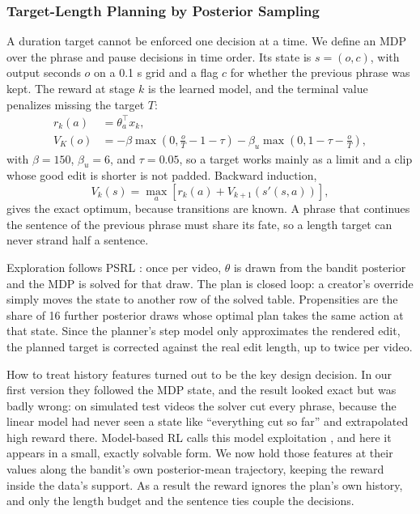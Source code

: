 \documentclass{ieeeaccess}
\begin{document}
\subsubsection{Target-Length Planning by Posterior Sampling}
A duration target cannot be enforced one decision at a time. We define an MDP over the phrase and pause decisions in time order. Its state is $s=(o,c)$, with output seconds $o$ on a 0.1 s grid and a flag $c$ for whether the previous phrase was kept. The reward at stage $k$ is the learned model, and the terminal value penalizes missing the target $T$:
\begin{align}
r_k(a) &= \theta_a^{\top} x_k, \\
V_K(o) &= -\beta \max\!\left(0,\tfrac{o}{T}-1-\tau\right) - \beta_u \max\!\left(0,1-\tau-\tfrac{o}{T}\right),
\end{align}
with $\beta=150$, $\beta_u=6$, and $\tau=0.05$, so a target works mainly as a limit and a clip whose good edit is shorter is not padded. Backward induction,
\begin{equation}
V_k(s) = \max_a \left[ r_k(a) + V_{k+1}\left(s'(s,a)\right) \right], \label{eq:bellman}
\end{equation}
gives the exact optimum, because transitions are known. A phrase that continues the sentence of the previous phrase must share its fate, so a length target can never strand half a sentence.

Exploration follows PSRL \cite{osband2013}: once per video, $\theta$ is drawn from the bandit posterior and the MDP is solved for that draw. The plan is closed loop: a creator's override simply moves the state to another row of the solved table. Propensities are the share of 16 further posterior draws whose optimal plan takes the same action at that state. Since the planner's step model only approximates the rendered edit, the planned target is corrected against the real edit length, up to twice per video.

How to treat history features turned out to be the key design decision. In our first version they followed the MDP state, and the result looked exact but was badly wrong: on simulated test videos the solver cut every phrase, because the linear model had never seen a state like ``everything cut so far'' and extrapolated high reward there. Model-based RL calls this model exploitation \cite{janner2019,yu2020}, and here it appears in a small, exactly solvable form. We now hold those features at their values along the bandit's own posterior-mean trajectory, keeping the reward inside the data's support. As a result the reward ignores the plan's own history, and only the length budget and the sentence ties couple the decisions.
\end{document}
